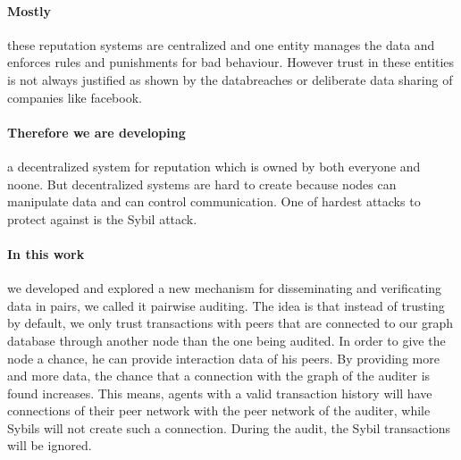 \paragraph{Mostly} these reputation systems are centralized and one entity manages the data and 
enforces rules and punishments for bad behaviour. However trust in these entities
is not always justified as shown by the databreaches or deliberate data sharing
of companies like facebook.

\paragraph{Therefore we are developing} a decentralized system for reputation 
which is owned by both everyone and noone. But decentralized systems are hard
to create because nodes can manipulate data and can control communication. One
of hardest attacks to protect against is the Sybil attack.  

\paragraph{In this work} we developed and explored a new mechanism for 
disseminating and verificating data in pairs, we called it pairwise auditing.
The idea is that instead of trusting by default, we only trust transactions with
peers that are connected to our graph database through another node than the 
one being audited. In order to give the node a chance, he can provide interaction
data of his peers. By providing more and more data, the chance that a connection
with the graph of the auditer is found increases. This means, agents with a valid
transaction history will have connections of their peer network with the peer
network of the auditer, while Sybils will not create such a connection. During
the audit, the Sybil transactions will be ignored.

